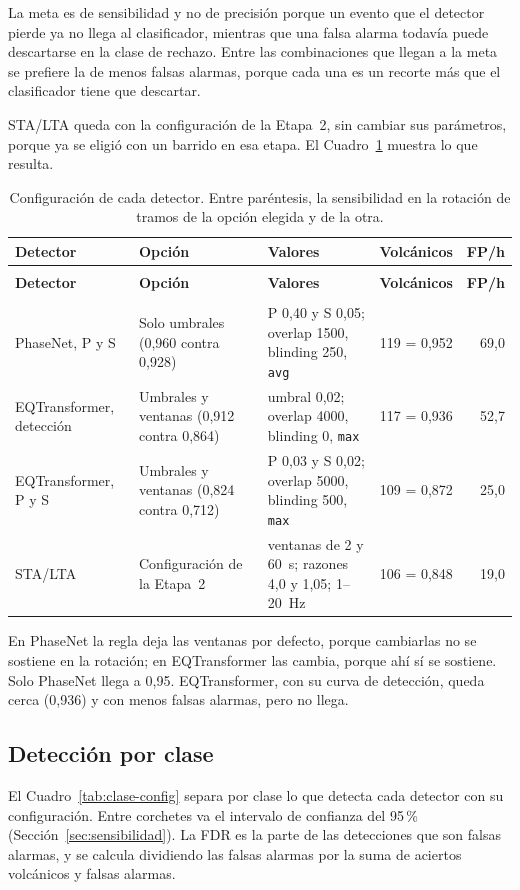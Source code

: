 \documentclass[11pt,a4paper,oneside,spanish,oldfontcommands]{memoir}
\newcommand{\cabecera}[2]{%
  \toprule #1 \\ \midrule \endfirsthead
  \multicolumn{#2}{l}{\itshape Cuadro \thetable{} (continuación)}\\
  \toprule #1 \\ \midrule \endhead
  \midrule \multicolumn{#2}{r}{\itshape Continúa en la página siguiente}\\ \endfoot
  \bottomrule \endlastfoot}
\begin{document}
La meta es de sensibilidad y no de precisión porque un evento que el detector
pierde ya no llega al clasificador, mientras que una falsa alarma todavía puede
descartarse en la clase de rechazo. Entre las combinaciones que llegan a la
meta se prefiere la de menos falsas alarmas, porque cada una es un recorte más
que el clasificador tiene que descartar.

STA/LTA queda con la configuración de la Etapa~2, sin cambiar sus parámetros,
porque ya se eligió con un barrido en esa etapa. El Cuadro~\ref{tab:config}
muestra lo que resulta.

{\small
\setlength{\tabcolsep}{4pt}
\begin{longtable}{>{\raggedright\arraybackslash}p{2.9cm}>{\raggedright\arraybackslash}p{3.3cm}>{\raggedright\arraybackslash}p{4.6cm}rr}
\caption{Configuración de cada detector. Entre paréntesis, la sensibilidad en la rotación de tramos de la opción elegida y de la otra.}\label{tab:config}\\
\cabecera{\textbf{Detector} & \textbf{Opción} & \textbf{Valores} & \textbf{Volcánicos} & \textbf{FP/h}}{5}
PhaseNet, P y S & Solo umbrales (0,960 contra 0,928) & P 0,40 y S 0,05; overlap 1500, blinding 250, \texttt{avg} & 119 = 0,952 & 69,0 \\
EQTransformer, detección & Umbrales y ventanas (0,912 contra 0,864) & umbral 0,02; overlap 4000, blinding 0, \texttt{max} & 117 = 0,936 & 52,7 \\
EQTransformer, P y S & Umbrales y ventanas (0,824 contra 0,712) & P 0,03 y S 0,02; overlap 5000, blinding 500, \texttt{max} & 109 = 0,872 & 25,0 \\
STA/LTA & Configuración de la Etapa~2 & ventanas de 2 y 60~s; razones 4,0 y 1,05; 1--20~Hz & 106 = 0,848 & 19,0 \\
\end{longtable}
}

En PhaseNet la regla deja las ventanas por defecto, porque cambiarlas no se
sostiene en la rotación; en EQTransformer las cambia, porque ahí sí se
sostiene. Solo PhaseNet llega a 0,95. EQTransformer, con su curva de detección,
queda cerca (0,936) y con menos falsas alarmas, pero no llega.

\subsection*{Detección por clase}

El Cuadro~\ref{tab:clase-config} separa por clase lo que detecta cada detector
con su configuración. Entre corchetes va el intervalo de confianza del 95\,\%
(Sección~\ref{sec:sensibilidad}). La FDR es la parte de las detecciones que son falsas alarmas, y se calcula dividiendo las falsas alarmas por la suma de aciertos volcánicos y falsas alarmas.
\end{document}

